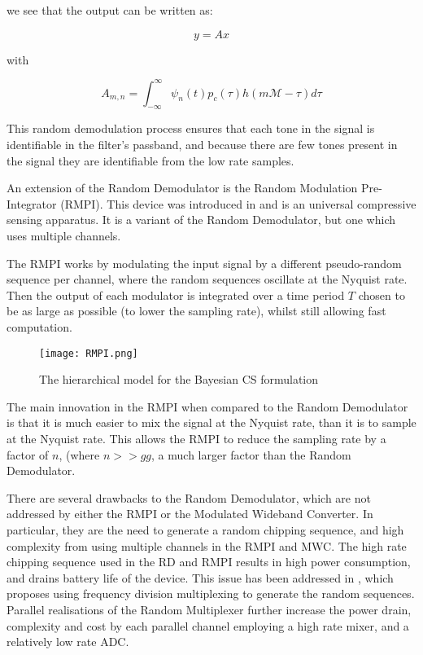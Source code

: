 we see that the output can be written as:

\begin{equation}
y = Ax
\end{equation}

with

\begin{equation}
A_{m,n} = \int_{-\infty}^{\infty} \psi_n\left(t\right)p_c\left(\tau\right)h\left(m\mathcal{M} - \tau\right)d\tau
\end{equation}

This random demodulation process ensures that each tone in the signal is identifiable in the filter's passband, and because there are few tones present in the signal they are identifiable from the low rate samples. 

An extension of the Random Demodulator is the Random Modulation Pre-Integrator (RMPI). This device was introduced in \cite{yoo2012design} and is an universal compressive sensing apparatus. It is a variant of the Random Demodulator, but one which uses multiple channels. 

The RMPI works by modulating the input signal by a different pseudo-random sequence per channel, where the random sequences oscillate at the Nyquist rate. Then the output of each modulator is integrated over a time period \(T\) chosen to be as large as possible (to lower the sampling rate), whilst still allowing fast computation. 

\begin{figure*}[h]
\centering
\texttt{[image: RMPI.png]}
\caption{The hierarchical model for the Bayesian CS formulation \cite{Ji2008}}
\label{bayesiancs}
\end{figure*}

The main innovation in the RMPI when compared to the Random Demodulator is that it is much easier to mix the signal at the Nyquist rate, than it is to sample at the Nyquist rate. This allows the RMPI to reduce the sampling rate by a factor of \(n\), (where \(n >> gg\), a much larger factor than the Random Demodulator. 

There are several drawbacks to the Random Demodulator, which are not addressed by either the RMPI or the Modulated Wideband Converter. In particular, they are the need to generate a random chipping sequence, and high complexity from using multiple channels in the RMPI and MWC. The high rate chipping sequence used in the RD and RMPI results in high power consumption, and drains battery life of the device. This issue has been addressed in \cite{massoud2011efficient}, which proposes using frequency division multiplexing to generate the random sequences. Parallel realisations of the Random Multiplexer further increase the power drain, complexity and cost by each parallel channel employing a high rate mixer, and a relatively low rate ADC. 

